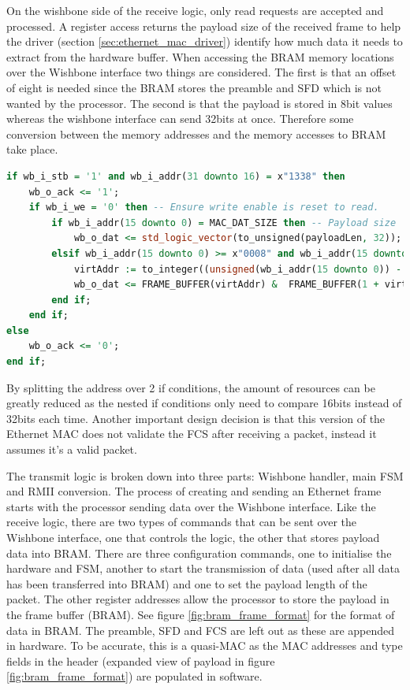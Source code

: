 On the wishbone side of the receive logic, only read requests are accepted and processed. A register access returns the payload size of the received frame to help the driver (section \ref{sec:ethernet_mac_driver}) identify how much data it needs to extract from the hardware buffer. When accessing the BRAM memory locations over the Wishbone interface two things are considered. The first is that an offset of eight is needed since the BRAM stores the preamble and SFD which is not wanted by the processor. The second is that the payload is stored in 8bit values whereas the wishbone interface can send 32bits at once. Therefore some conversion between the memory addresses and the memory accesses to BRAM take place. 


\newpage

\begin{lstlisting}[language=VHDL, caption=Wishbone access logic for Ethernet receive]
if wb_i_stb = '1' and wb_i_addr(31 downto 16) = x"1338" then 
    wb_o_ack <= '1';
    if wb_i_we = '0' then -- Ensure write enable is reset to read.
        if wb_i_addr(15 downto 0) = MAC_DAT_SIZE then -- Payload size
            wb_o_dat <= std_logic_vector(to_unsigned(payloadLen, 32));
        elsif wb_i_addr(15 downto 0) >= x"0008" and wb_i_addr(15 downto 0) <= x"05F8" then -- BRAM access
            virtAddr := to_integer((unsigned(wb_i_addr(15 downto 0)) - 8));
            wb_o_dat <= FRAME_BUFFER(virtAddr) &  FRAME_BUFFER(1 + virtAddr) & FRAME_BUFFER(2 + virtAddr) & FRAME_BUFFER(3 + virtAddr);
        end if;
    end if;
else
    wb_o_ack <= '0';
end if;
\end{lstlisting}

\noindent By splitting the address over 2 if conditions, the amount of resources can be greatly reduced as the nested if conditions only need to compare 16bits instead of 32bits each time. Another important design decision is that this version of the Ethernet MAC does not validate the FCS after receiving a packet, instead it assumes it's a valid packet. 


The transmit logic is broken down into three parts: Wishbone handler, main FSM and RMII conversion. The process of creating and sending an Ethernet frame starts with the processor sending data over the Wishbone interface. Like the receive logic, there are two types of commands that can be sent over the Wishbone interface, one that controls the logic, the other that stores payload data into BRAM. There are three configuration commands, one to initialise the hardware and FSM, another to start the transmission of data (used after all data has been transferred into BRAM) and one to set the payload length of the packet. The other register addresses allow the processor to store the payload in the frame buffer (BRAM). See figure \ref{fig:bram_frame_format} for the format of data in BRAM. The preamble, SFD and FCS are left out as these are appended in hardware. To be accurate, this is a quasi-MAC as the MAC addresses and type fields in the header (expanded view of payload in figure \ref{fig:bram_frame_format}) are populated in software. 

